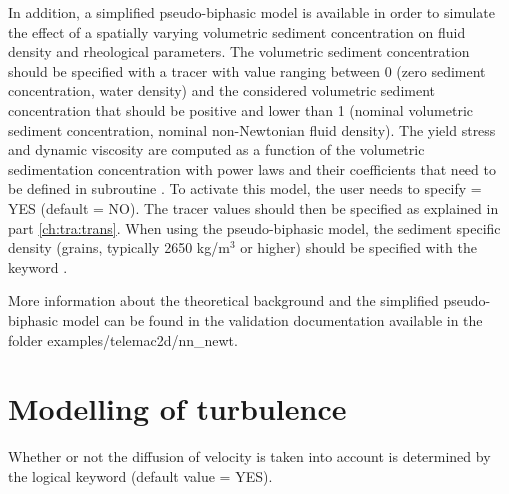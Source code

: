 In addition, a simplified pseudo-biphasic model is available in order
to simulate the effect of a spatially varying volumetric sediment
concentration on fluid density and rheological parameters. The
volumetric sediment concentration should be specified with a tracer
with value ranging between 0 (zero sediment concentration,
water density) and the considered volumetric sediment concentration
that should be positive and lower than 1 (nominal volumetric sediment
concentration, nominal non-Newtonian fluid density).
The yield stress and dynamic viscosity are computed as a function of
the volumetric sedimentation concentration with power laws and their
coefficients that need to be defined in subroutine
. To activate this model, the user needs to
specify  = YES
(default = NO).
The tracer values should then be specified as explained in part
\ref{ch:tra:trans}.
When using the pseudo-biphasic model, the sediment specific
density (grains, typically 2650 kg/m$^3$ or higher) should be
specified with the keyword .

More information about the theoretical background and the simplified
pseudo-biphasic model can be found in the validation documentation available
in the folder examples/telemac2d/nn\_newt.

\section{Modelling of turbulence}
\label{sec:mod:turbul}
Whether or not the diffusion of velocity is taken into account is determined
by the logical keyword  (default value = YES).

